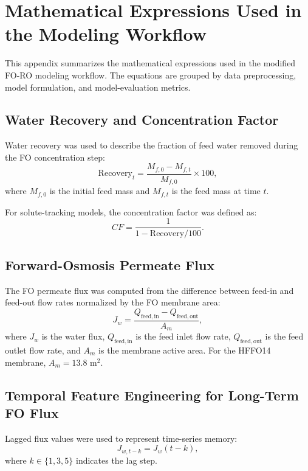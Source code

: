 \appendix
\section{Mathematical Expressions Used in the Modeling Workflow}

This appendix summarizes the mathematical expressions used in the modified FO-RO modeling workflow. The equations are grouped by data preprocessing, model formulation, and model-evaluation metrics.

\subsection{Water Recovery and Concentration Factor}
Water recovery was used to describe the fraction of feed water removed during the FO concentration step:
\begin{equation}
\mathrm{Recovery}_t =
\frac{M_{f,0}-M_{f,t}}{M_{f,0}} \times 100,
\end{equation}
where $M_{f,0}$ is the initial feed mass and $M_{f,t}$ is the feed mass at time $t$.

For solute-tracking models, the concentration factor was defined as:
\begin{equation}
CF = \frac{1}{1-\mathrm{Recovery}/100}.
\end{equation}

\subsection{Forward-Osmosis Permeate Flux}
The FO permeate flux was computed from the difference between feed-in and feed-out flow rates normalized by the FO membrane area:
\begin{equation}
J_w = \frac{Q_{\mathrm{feed,in}} - Q_{\mathrm{feed,out}}}{A_m},
\end{equation}
where $J_w$ is the water flux, $Q_{\mathrm{feed,in}}$ is the feed inlet flow rate, $Q_{\mathrm{feed,out}}$ is the feed outlet flow rate, and $A_m$ is the membrane active area. For the HFFO14 membrane, $A_m = 13.8$ m$^2$.

\subsection{Temporal Feature Engineering for Long-Term FO Flux}
Lagged flux values were used to represent time-series memory:
\begin{equation}
J_{w,t-k} = J_w(t-k),
\end{equation}
where $k \in \{1,3,5\}$ indicates the lag step.


